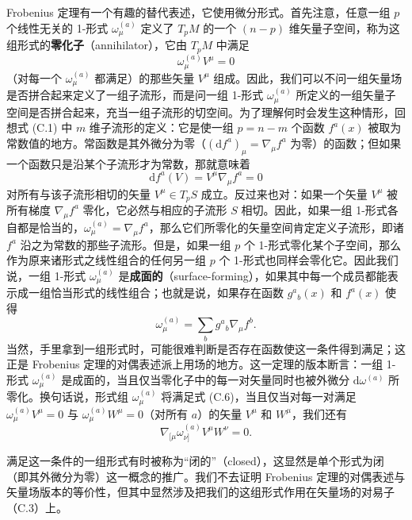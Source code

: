 Frobenius 定理有一个有趣的替代表述，它使用微分形式。首先注意，任意一组 $p$ 个线性无关的 1-形式 $\omega_\mu^{(a)}$ 定义了 $T_pM$ 的一个 $(n-p)$ 维矢量子空间，称为这组形式的\textbf{零化子}（annihilator），它由 $T_pM$ 中满足
\begin{equation*}
\omega_\mu^{(a)} V^\mu = 0
\tag{C.4}
\end{equation*}
（对每一个 $\omega_\mu^{(a)}$ 都满足）的那些矢量 $V^\mu$ 组成。因此，我们可以不问一组矢量场是否拼合起来定义了一组子流形，而是问一组 1-形式 $\omega_\mu^{(a)}$ 所定义的一组矢量子空间是否拼合起来，充当一组子流形的切空间。为了理解何时会发生这种情形，回想式 (C.1) 中 $m$ 维子流形的定义：它是使一组 $p = n - m$ 个函数 $f^a(x)$ 被取为常数值的地方。常函数是其外微分为零（$(\mathrm{d}f^a)_\mu = \nabla_\mu f^a$ 为零）的函数；但如果一个函数只是沿某个子流形才为常数，那就意味着
\begin{equation*}
\mathrm{d}f^a(V) = V^\mu \nabla_\mu f^a = 0
\tag{C.5}
\end{equation*}
对所有与该子流形相切的矢量 $V^\mu \in T_pS$ 成立。反过来也对：如果一个矢量 $V^\mu$ 被所有梯度 $\nabla_\mu f^a$ 零化，它必然与相应的子流形 $S$ 相切。因此，如果一组 1-形式各自都是恰当的，$\omega_\mu^{(a)} = \nabla_\mu f^a$，那么它们所零化的矢量空间肯定定义子流形，即诸 $f^a$ 沿之为常数的那些子流形。但是，如果一组 $p$ 个 1-形式零化某个子空间，那么作为原来诸形式之线性组合的任何另一组 $p$ 个 1-形式也同样会零化它。因此我们说，一组 1-形式 $\omega_\mu^{(a)}$ 是\textbf{成面的}（surface-forming），如果其中每一个成员都能表示成一组恰当形式的线性组合；也就是说，如果存在函数 $g^a{}_b(x)$ 和 $f^a(x)$ 使得
\begin{equation*}
\omega_\mu^{(a)} = \sum_b g^a{}_b \nabla_\mu f^b.
\tag{C.6}
\end{equation*}
当然，手里拿到一组形式时，可能很难判断是否存在函数使这一条件得到满足；这正是 Frobenius 定理的对偶表述派上用场的地方。这一定理的版本断言：一组 1-形式 $\omega_\mu^{(a)}$ 是成面的，当且仅当零化子中的每一对矢量同时也被外微分 $\mathrm{d}\omega^{(a)}$ 所零化。换句话说，形式组 $\omega_\mu^{(a)}$ 将满足式 (C.6)，当且仅当对每一对满足 $\omega_\mu^{(a)} V^\mu = 0$ 与 $\omega_\mu^{(a)} W^\mu = 0$（对所有 $a$）的矢量 $V^\mu$ 和 $W^\mu$，我们还有
\begin{equation*}
\nabla_{[\mu} \omega_{\nu]}^{(a)} V^\mu W^\nu = 0.
\tag{C.7}
\end{equation*}

满足这一条件的一组形式有时被称为“闭的”（closed），这显然是单个形式为闭（即其外微分为零）这一概念的推广。我们不去证明 Frobenius 定理的对偶表述与矢量场版本的等价性，但其中显然涉及把我们的这组形式作用在矢量场的对易子（C.3）上。

